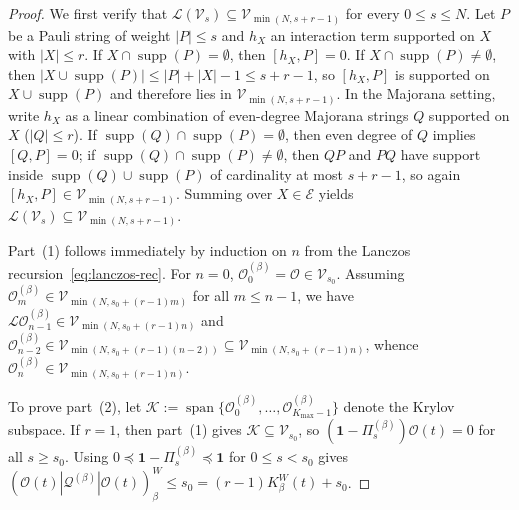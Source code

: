 \documentclass[11pt,a4paper]{article}
\numberwithin{equation}{section}
\theoremstyle{plain}
\theoremstyle{definition}
\newcommand{\supp}{\operatorname{supp}}
\begin{document}
\begin{proof}
We first verify that $\mathcal{L}(\mathcal{V}_s) \subseteq \mathcal{V}_{\min(N,s+r-1)}$ for every $0\le s\le N$. Let $P$ be a Pauli string of weight $|P|\le s$ and $h_X$ an interaction term supported on $X$ with $|X|\le r$. If $X\cap\supp(P)=\emptyset$, then $[h_X,P]=0$. If $X\cap\supp(P)\ne\emptyset$, then $|X\cup\supp(P)|\le |P|+|X|-1\le s+r-1$, so $[h_X,P]$ is supported on $X\cup\supp(P)$ and therefore lies in $\mathcal{V}_{\min(N,s+r-1)}$. In the Majorana setting, write $h_X$ as a linear combination of even-degree Majorana strings $Q$ supported on $X$ ($|Q|\le r$). If $\supp(Q)\cap\supp(P)=\emptyset$, then even degree of $Q$ implies $[Q,P]=0$; if $\supp(Q)\cap\supp(P)\ne\emptyset$, then $QP$ and $PQ$ have support inside $\supp(Q)\cup\supp(P)$ of cardinality at most $s+r-1$, so again $[h_X,P]\in\mathcal{V}_{\min(N,s+r-1)}$. Summing over $X\in\mathcal{E}$ yields $\mathcal{L}(\mathcal{V}_s)\subseteq\mathcal{V}_{\min(N,s+r-1)}$.

Part~(1) follows immediately by induction on $n$ from the Lanczos recursion~\eqref{eq:lanczos-rec}. For $n=0$, $\mathcal{O}_0^{(\beta)} = \mathcal{O}\in\mathcal{V}_{s_0}$. Assuming $\mathcal{O}_m^{(\beta)}\in\mathcal{V}_{\min(N,s_0+(r-1)m)}$ for all $m\le n-1$, we have $\mathcal{L}\mathcal{O}_{n-1}^{(\beta)}\in\mathcal{V}_{\min(N,s_0+(r-1)n)}$ and $\mathcal{O}_{n-2}^{(\beta)}\in\mathcal{V}_{\min(N,s_0+(r-1)(n-2))}\subseteq\mathcal{V}_{\min(N,s_0+(r-1)n)}$, whence $\mathcal{O}_n^{(\beta)}\in\mathcal{V}_{\min(N,s_0+(r-1)n)}$.

To prove part~(2), let $\mathcal{K} := \operatorname{span}\{\mathcal{O}_0^{(\beta)},\dots,\mathcal{O}_{K_{\max}-1}^{(\beta)}\}$ denote the Krylov subspace. If $r=1$, then part~(1) gives $\mathcal{K}\subseteq\mathcal{V}_{s_0}$, so $(\mathbf{1}-\Pi_s^{(\beta)})\mathcal{O}(t)=0$ for all $s\ge s_0$. Using $0\preceq\mathbf{1}-\Pi_s^{(\beta)}\preceq\mathbf{1}$ for $0\le s < s_0$ gives $(\mathcal{O}(t)|\mathcal{Q}^{(\beta)}|\mathcal{O}(t))_\beta^W \le s_0 = (r-1)K_\beta^W(t)+s_0$.


\end{proof}
\end{document}
